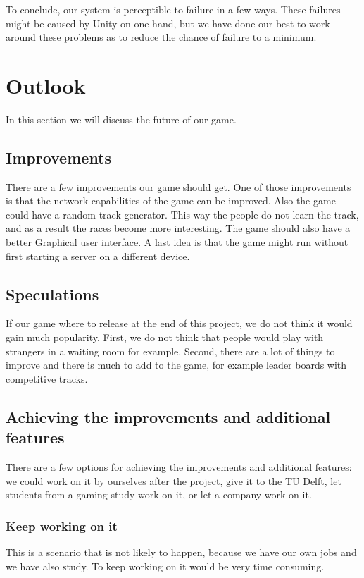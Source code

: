\documentclass[11pt,twoside,a4paper]{article}
\begin{document}
\newline
\newline
To conclude, our system is perceptible to failure in a few ways. These failures might be caused by Unity on one hand, but we have done our best to work around these problems as to reduce the chance of failure to a minimum.

\clearpage

\section{Outlook}
In this section we will discuss the future of our game.

\subsection{Improvements}
There are a few improvements our game should get. One of those improvements is that the network capabilities of the game can be improved. Also the game could have a random track generator. This way the people do not learn the track, and as a result the races become more interesting. The game should also have a better Graphical user interface. A last idea is that the game might run without first starting a server on a different device.

\subsection{Speculations}
If our game where to release at the end of this project, we do not think it would gain much popularity. First, we do not think that people would play with strangers in a waiting room for example. Second, there are a lot of things to improve and there is much to add to the game, for example leader boards with competitive tracks.

\subsection{Achieving the improvements and additional features}
There are a few options for achieving the improvements and additional features: we could work on it by ourselves after the project, give it to the TU Delft, let students from a gaming study work on it, or let a company work on it.
\subsubsection{Keep working on it}
This is a scenario that is not likely to happen, because we have our own jobs and we have also study. To keep working on it would be very time consuming.
\end{document}
